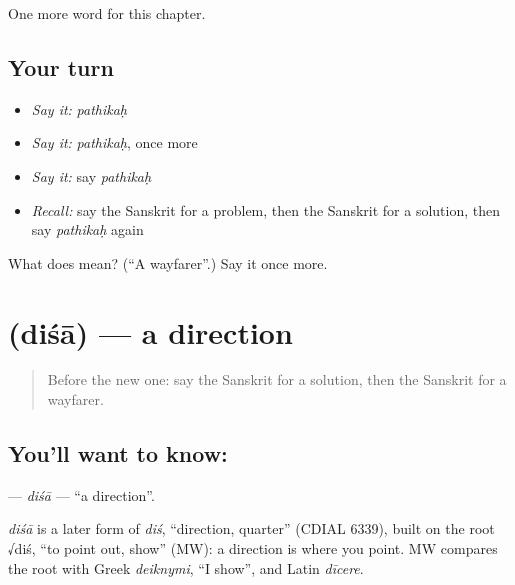 \begin{grammarlens}[title={What you've built}]
One more word for this chapter.
\end{grammarlens}

\subsection*{Your turn}
\begin{itemize}
\raggedright
  \item \emph{Say it:} \emph{pathikaḥ}
  \item \emph{Say it:} \emph{pathikaḥ}, once more
  \item \emph{Say it:} say \emph{pathikaḥ}
  \item \emph{Recall:} say the Sanskrit for a problem, then the Sanskrit for a solution, then say \emph{pathikaḥ} again
\end{itemize}

\begin{tcolorbox}[breakable,colback=teal!4,colframe=teal!35!black,title={Before you move on}]
What does  mean? (\textquotedblleft{}A wayfarer\textquotedblright{}.) Say it once more.
\end{tcolorbox}
\section[\texorpdfstring{\sk{दिशा} (diśā)}{दिशा (diśā)}]{ (diśā) — a direction}

\label{lesson:SA-C202-disa}



\begin{quote}
Before the new one: say the Sanskrit for a solution, then the Sanskrit for a wayfarer.
\end{quote}

\subsection*{You'll want to know: }
\textbf{} — \emph{diśā} — \textquotedblleft{}a direction\textquotedblright{}.

\begin{cousinweb}
\emph{diśā} is a later form of \emph{diś}, \textquotedblleft{}direction, quarter\textquotedblright{} (CDIAL 6339), built on the root √diś, \textquotedblleft{}to point out, show\textquotedblright{} (MW): a direction is where you point. MW compares the root with Greek \emph{deiknymi}, \textquotedblleft{}I show\textquotedblright{}, and Latin \emph{dīcere}.
\end{cousinweb}


